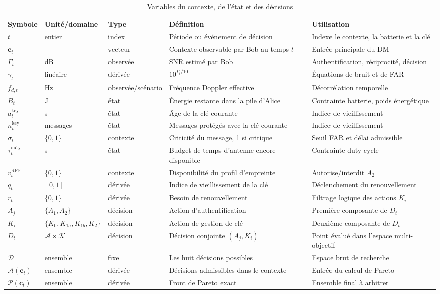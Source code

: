 \documentclass[conference,a4paper]{IEEEtran}
\begin{document}
\begin{table}[H]
\caption{Variables du contexte, de l'état et des décisions}
\label{tab:variables-context}
\centering\footnotesize
\begin{tabularx}{\textwidth}{@{}l l l Y Y@{}}
\toprule
Symbole & Unité/domaine & Type & Définition & Utilisation \\
\midrule
$t$ & entier & index & Période ou événement de décision & Indexe le contexte, la batterie et la clé \\
$\mathbf{c}_t$ & -- & vecteur & Contexte observable par Bob au temps $t$ & Entrée principale du DM \\
$\Gamma_t$ & dB & observée & SNR estimé par Bob & Authentification, réciprocité, décision \\
$\gamma_t$ & linéaire & dérivée & $10^{\Gamma_t/10}$ & Équations de bruit et de FAR \\
$f_{d,t}$ & Hz & observée/scénario & Fréquence Doppler effective & Décorrélation temporelle \\
$B_t$ & J & état & Énergie restante dans la pile d'Alice & Contrainte batterie, poids énergétique \\
$a_t^{\mathrm{key}}$ & s & état & Âge de la clé courante & Indice de vieillissement \\
$n_t^{\mathrm{key}}$ & messages & état & Messages protégés avec la clé courante & Indice de vieillissement \\
$\sigma_t$ & $\{0,1\}$ & contexte & Criticité du message, 1 si critique & Seuil FAR et délai admissible \\
$\tau_t^{\mathrm{duty}}$ & s & état & Budget de temps d'antenne encore disponible & Contrainte duty-cycle \\
$v_t^{\mathrm{RFF}}$ & $\{0,1\}$ & contexte & Disponibilité du profil d'empreinte & Autorise/interdit $A_2$ \\
$q_t$ & $[0,1]$ & dérivée & Indice de vieillissement de la clé & Déclenchement du renouvellement \\
$r_t$ & $\{0,1\}$ & dérivée & Besoin de renouvellement & Filtrage logique des actions $K_i$ \\
$A_j$ & $\{A_1,A_2\}$ & décision & Action d'authentification & Première composante de $D_t$ \\
$K_i$ & $\{K_0,K_{1a},K_{1b},K_2\}$ & décision & Action de gestion de clé & Deuxième composante de $D_t$ \\
$D_t$ & $\mathcal{A}\times\mathcal{K}$ & décision & Décision conjointe $(A_j,K_i)$ & Point évalué dans l'espace multi-objectif \\
$\mathcal{D}$ & ensemble & fixe & Les huit décisions possibles & Espace brut de recherche \\
$\mathcal{A}(\mathbf{c}_t)$ & ensemble & dérivée & Décisions admissibles dans le contexte & Entrée du calcul de Pareto \\
$\mathcal{P}(\mathbf{c}_t)$ & ensemble & dérivée & Front de Pareto exact & Ensemble final à arbitrer \\
\bottomrule
\end{tabularx}
\end{table}
\end{document}
